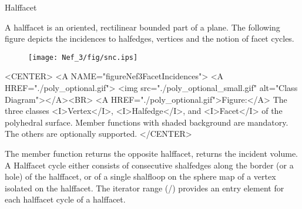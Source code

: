 
\ccRefPageBegin



\begin{ccRefClass}{Halffacet}

\ccDefinition

A halffacet is an oriented, rectilinear bounded part of a plane. The following
figure depicts the incidences to halfedges, vertices and the notion of facet
cycles.

\begin{ccTexOnly}
    \begin{figure}[bht]
        \begin{center}
          \parbox{0.4\textwidth}{%
              \texttt{[image: Nef\_3/fig/snc.ips]}%
          }
        \end{center}
        \label{figureNef3FacetIncidences}
    \end{figure}
\end{ccTexOnly}

\begin{ccHtmlOnly}
    <CENTER>
    <A NAME="figureNef3FacetIncidences">
    <A HREF="./poly_optional.gif">
        <img src="./poly_optional_small.gif" 
             alt="Class Diagram"></A><BR>
    <A HREF="./poly_optional.gif">Figure:</A>
    The three classes <I>Vertex</I>, <I>Halfedge</I>, and 
          <I>Facet</I> of the polyhedral surface. Member
          functions with shaded background are mandatory. The others
          are optionally supported.
    </CENTER>
\end{ccHtmlOnly}

The member function  returns the opposite halffacet, 
returns the incident volume. A Halffacet cycle either consists of consecutive
shalfedges along the border (or a hole) of the halffacet, or of a single
shalfloop on the sphere map of a vertex isolated on the halffacet. The 
iterator range (/)
provides an entry element for each halffacet cycle of a halffacet.


\end{ccRefClass}
